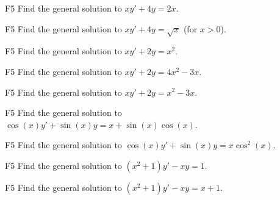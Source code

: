 \begin{problem}{F5}
Find the general solution to \(xy' + 4y = 2x\).
\end{problem}

\begin{problem}{F5}
Find the general solution to \(xy' + 4y = \sqrt{x}\) (for \(x>0\)).
\end{problem}

\begin{problem}{F5}
Find the general solution to \(xy' + 2y = x^2\).
\end{problem}

\begin{problem}{F5}
Find the general solution to \(xy' + 2y = 4x^2-3x\).
\end{problem}

\begin{problem}{F5}
Find the general solution to \(xy' + 2y = x^2-3x\).
\end{problem}

\begin{problem}{F5}
Find the general solution to \(\cos(x) y' + \sin (x)y = x +\sin(x)\cos(x) \).
\end{problem}

\begin{problem}{F5}
Find the general solution to \(\cos(x) y' + \sin (x)y = x \cos^2(x) \).
\end{problem}

\begin{problem}{F5}
Find the general solution to \((x^2+1)y' - xy =1 \).
\end{problem}

\begin{problem}{F5}
Find the general solution to \((x^2+1)y' - xy =x+1 \).
\end{problem}
